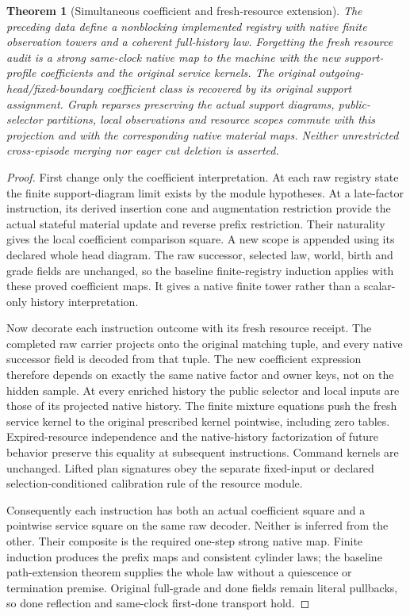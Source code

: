 \documentclass{article}
\newtheorem{theorem}{Theorem}
\begin{document}
\begin{theorem}[Simultaneous coefficient and fresh-resource extension]
The preceding data define a nonblocking implemented registry with native finite observation towers and a coherent full-history law. Forgetting the fresh resource audit is a strong same-clock native map to the machine with the new support-profile coefficients and the original service kernels. The original outgoing-head/fixed-boundary coefficient class is recovered by its original support assignment. Graph reparses preserving the actual support diagrams, public-selector partitions, local observations and resource scopes commute with this projection and with the corresponding native material maps. Neither unrestricted cross-episode merging nor eager cut deletion is asserted.
\end{theorem}
\begin{proof}
First change only the coefficient interpretation. At each raw registry state the finite support-diagram limit exists by the module hypotheses. At a late-factor instruction, its derived insertion cone and augmentation restriction provide the actual stateful material update and reverse prefix restriction. Their naturality gives the local coefficient comparison square. A new scope is appended using its declared whole head diagram. The raw successor, selected law, world, birth and grade fields are unchanged, so the baseline finite-registry induction applies with these proved coefficient maps. It gives a native finite tower rather than a scalar-only history interpretation.

Now decorate each instruction outcome with its fresh resource receipt. The completed raw carrier projects onto the original matching tuple, and every native successor field is decoded from that tuple. The new coefficient expression therefore depends on exactly the same native factor and owner keys, not on the hidden sample. At every enriched history the public selector and local inputs are those of its projected native history. The finite mixture equations push the fresh service kernel to the original prescribed kernel pointwise, including zero tables. Expired-resource independence and the native-history factorization of future behavior preserve this equality at subsequent instructions. Command kernels are unchanged. Lifted plan signatures obey the separate fixed-input or declared selection-conditioned calibration rule of the resource module.

Consequently each instruction has both an actual coefficient square and a pointwise service square on the same raw decoder. Neither is inferred from the other. Their composite is the required one-step strong native map. Finite induction produces the prefix maps and consistent cylinder laws; the baseline path-extension theorem supplies the whole law without a quiescence or termination premise. Original full-grade and done fields remain literal pullbacks, so done reflection and same-clock first-done transport hold.


\end{proof}
\end{document}
